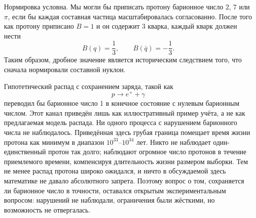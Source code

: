 \begin{classroomqa}
\end{classroomqa}

Нормировка условна. Мы могли бы приписать протону барионное число \(2\), \(7\) или \(\pi\), если бы каждая составная частица масштабировалась согласованно. После того как протону приписано \(B=1\) и он содержит 3 кварка, каждый кварк должен нести
\begin{equation}
B(q)=\frac13,
\qquad
B(\bar q)=-\frac13.
\end{equation}
Таким образом, дробное значение является историческим следствием того, что сначала нормировали составной нуклон.

\begin{classroomqa}
\end{classroomqa}

Гипотетический распад с сохранением заряда, такой как
\begin{equation}
p\longrightarrow e^++\gamma
\end{equation}
переводил бы барионное число 1 в конечное состояние с нулевым барионным числом. Этот канал приведён лишь как иллюстративный пример учёта, а не как предлагаемая модель распада. Ни одного процесса с нарушением барионного числа не наблюдалось. Приведённая здесь грубая граница помещает время жизни протона как минимум в диапазон \(10^{33}\)--\(10^{34}\) лет. Никто не наблюдает один-единственный протон так долго; наблюдают огромное число протонов в течение приемлемого времени, компенсируя длительность жизни размером выборки. Тем не менее распад протона широко ожидался, и ничто в обсуждаемой здесь математике не давало абсолютного запрета. Поэтому вопрос о том, сохраняется ли барионное число в точности, оставался открытым экспериментальным вопросом: нарушений не наблюдали, ограничения были жёсткими, но возможность не отвергалась.

